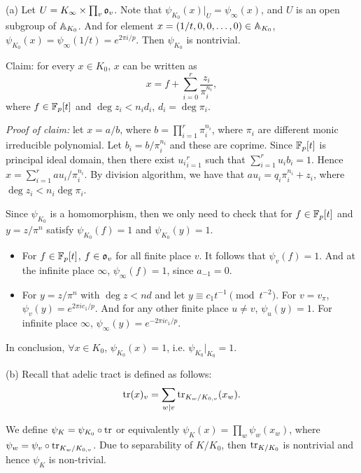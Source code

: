 \begin{solution}
  (a) Let $U = K_\infty \times \prod_{v} \mathfrak{o}_v$. Note that
  $\psi_{K_0}(x) | _U =\psi_\infty(x)$, and $U$ is an open subgroup of
  $\mathbb{A}_{K_0}$. And for element $x = (1/t, 0, 0, \ldots, 0) \in \mathbb{A}_{K_0}$,
  $\psi_{K_0} (x) = \psi_\infty (1 / t) = e ^ {2 \pi i/ p}$.
  Then $\psi_{K_0}$ is nontrivial.

  Claim: for every $x \in K_0$, $x$ can be written as
  \[x = f + \sum_{i = 0}^{r} \frac{z_i}{\pi_i ^ {n_i}},\]
  where $f \in \mathbb{F}_p[t]$ and $\deg z_i < n_i d_i$, $d_i = \deg \pi_i$.

  \textit{Proof of claim:} let $x = a / b$, where
  $b = \prod_{i = 1}^{r} \pi_i ^ {n_i}$, where $\pi_i$ are different monic
  irreducible polynomial. Let $b_i = b / \pi_i^{n_i}$ and
  these are coprime. Since $\mathbb{F}_p[t]$ is principal ideal domain, then
  there exist ${u_i}_{i = 1}^r$ such that $\sum_{i=1}^{r} u_i b_i = 1$.
  Hence $x = \sum_{i =1}^{r} a u_i / \pi_i^{n_i}$. By division algorithm,
  we have that $a u_i = q_i \pi_i ^ {n_i} + z_i$,
  where $\deg z_i < n_i \deg \pi_i$.

  Since $\psi_{K_0}$ is a homomorphism, then we only need to check that
  for $f \in \mathbb{F}_p[t]$ and $y = z/ \pi ^ n$ satisfy $\psi_{K_0} (f) = 1$ and
  $\psi_{K_0} (y) = 1$.

  \begin{itemize}
    \item For $f \in \mathbb{F}_p[t]$, $f \in \mathfrak{o}_v$ for all finite place $v$.
    It follows that $\psi_v(f) = 1$. And at the infinite place $\infty$,
    $\psi_\infty (f) = 1$, since $a_{-1} = 0$.
    \item For $y = z / \pi^ n$ with $\deg z < n d$ and let
    $y \equiv c_1 t ^ {-1} \pmod{t ^ {-2}}$. For $v = v_\pi$,
    $\psi_v (y) = e^{2\pi i c_1 / p}$. And for any other finite place
    $u \neq v$, $\psi_u(y) = 1$. For infinite place $\infty$,
    $\psi_\infty (y) = e^{-2 \pi i c_1 / p}$.
  \end{itemize}

  In conclusion, $\forall x \in K_0$, $\psi_{K_0} (x) = 1$, i.e.
  $\psi_{K_0} | _{K_0} = 1$.

  (b) Recall that adelic tract is defined as follows:
  \[\operatorname{tr} (x)_v = \sum_{w \mid v} \operatorname{tr}_{K_w / K_{0, v}} (x_w). \]

  We define $\psi_K = \psi_{K_0} \circ \operatorname{tr}$ or equivalently
  $\psi_K(x) = \prod_{w} \psi_w (x_w)$, where
  $\psi_w = \psi_v \circ \operatorname{tr}_{K_w/ K_{0, v}}$. Due to separability
  of $K/ K_0$, then $\operatorname{tr}_{K/ K_0}$ is nontrivial and
  hence $\psi_K$ is non-trivial.


\end{solution}
